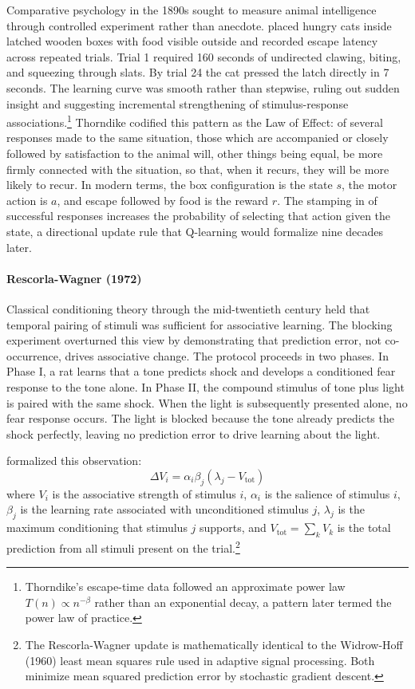 Comparative psychology in the 1890s sought to measure animal intelligence through controlled experiment rather than anecdote. \citet{Thorndike1898} placed hungry cats inside latched wooden boxes with food visible outside and recorded escape latency across repeated trials. Trial 1 required 160 seconds of undirected clawing, biting, and squeezing through slats. By trial 24 the cat pressed the latch directly in 7 seconds. The learning curve was smooth rather than stepwise, ruling out sudden insight and suggesting incremental strengthening of stimulus-response associations.\footnote{Thorndike's escape-time data followed an approximate power law $T(n) \propto n^{-\beta}$ rather than an exponential decay, a pattern later termed the power law of practice.} Thorndike codified this pattern as the Law of Effect: of several responses made to the same situation, those which are accompanied or closely followed by satisfaction to the animal will, other things being equal, be more firmly connected with the situation, so that, when it recurs, they will be more likely to recur. In modern terms, the box configuration is the state $s$, the motor action is $a$, and escape followed by food is the reward $r$. The stamping in of successful responses increases the probability of selecting that action given the state, a directional update rule that Q-learning would formalize nine decades later.

\paragraph{Rescorla-Wagner (1972)}

Classical conditioning theory through the mid-twentieth century held that temporal pairing of stimuli was sufficient for associative learning. The blocking experiment overturned this view by demonstrating that prediction error, not co-occurrence, drives associative change. The protocol proceeds in two phases. In Phase I, a rat learns that a tone predicts shock and develops a conditioned fear response to the tone alone. In Phase II, the compound stimulus of tone plus light is paired with the same shock. When the light is subsequently presented alone, no fear response occurs. The light is blocked because the tone already predicts the shock perfectly, leaving no prediction error to drive learning about the light.

\citet{RescorlaWagner1972} formalized this observation:
\begin{equation}
\Delta V_i = \alpha_i \beta_j (\lambda_j - V_{\text{tot}})
\end{equation}
where $V_i$ is the associative strength of stimulus $i$, $\alpha_i$ is the salience of stimulus $i$, $\beta_j$ is the learning rate associated with unconditioned stimulus $j$, $\lambda_j$ is the maximum conditioning that stimulus $j$ supports, and $V_{\text{tot}} = \sum_k V_k$ is the total prediction from all stimuli present on the trial.\footnote{The Rescorla-Wagner update is mathematically identical to the Widrow-Hoff (1960) least mean squares rule used in adaptive signal processing. Both minimize mean squared prediction error by stochastic gradient descent.}

